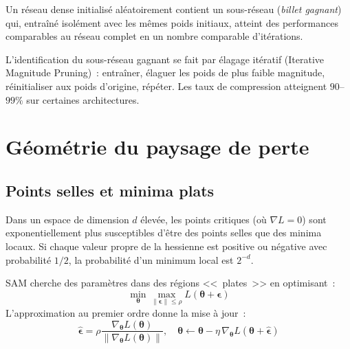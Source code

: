 \begin{theoreme}
\label{thm:lottery}
Un r\'eseau dense initialis\'e al\'eatoirement contient un sous-r\'eseau
(\emph{billet gagnant}) qui, entra\^in\'e isol\'ement avec les m\^emes poids
initiaux, atteint des performances comparables au r\'eseau complet en un
nombre comparable d'it\'erations.
\end{theoreme}

\begin{remarque}
L'identification du sous-r\'eseau gagnant se fait par \'elagage it\'eratif
(Iterative Magnitude Pruning)~: entra\^iner, \'elaguer les poids de plus
faible magnitude, r\'einitialiser aux poids d'origine, r\'ep\'eter.
Les taux de compression atteignent $90$--$99\%$ sur certaines architectures.
\end{remarque}

\section{G\'eom\'etrie du paysage de perte}
\label{sec:loss-landscape}

\subsection{Points selles et minima plats}

\begin{proposition}
\label{prop:saddle-points}
Dans un espace de dimension $d$ \'elev\'ee, les points critiques
(o\`u $\nabla L = 0$) sont exponentiellement plus susceptibles d'\^etre
des points selles que des minima locaux. Si chaque valeur propre de la
hessienne est positive ou n\'egative avec probabilit\'e $1/2$, la probabilit\'e
d'un minimum local est $2^{-d}$.
\end{proposition}

\begin{definition}
\label{def:sam}
SAM cherche des param\`etres dans des r\'egions <<~plates~>> en optimisant~:
\begin{equation}
\min_{\boldsymbol{\theta}} \max_{\|\boldsymbol{\epsilon}\| \leq \rho} L(\boldsymbol{\theta} + \boldsymbol{\epsilon})
\end{equation}
L'approximation au premier ordre donne la mise \`a jour~:
\begin{equation}
\hat{\boldsymbol{\epsilon}} = \rho \frac{\nabla_{\boldsymbol{\theta}} L(\boldsymbol{\theta})}{\|\nabla_{\boldsymbol{\theta}} L(\boldsymbol{\theta})\|}, \quad
\boldsymbol{\theta} \leftarrow \boldsymbol{\theta} - \eta\,\nabla_{\boldsymbol{\theta}} L(\boldsymbol{\theta} + \hat{\boldsymbol{\epsilon}})
\end{equation}
\end{definition}

